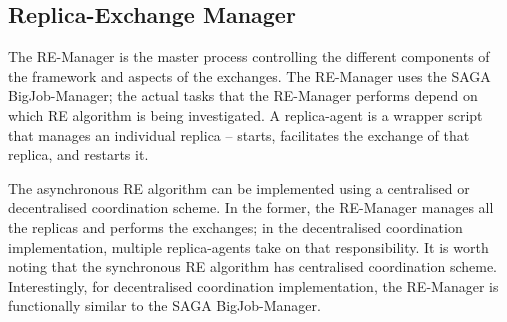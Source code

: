 \documentclass{rspublic}
\newcommand{\jhanote}[1]{ {\textcolor{red} { ***shantenu: #1 }}}
\newcommand{\athotanote}[1]{ {\textcolor{green} { ***athota: #1 }}}
\newcommand{\athotanote}[1]{}
\newcommand{\jhanote}[1]{}
\begin{document}
\subsection{Replica-Exchange Manager}\label{repexmanager} 

  
  
The RE-Manager is the master process controlling the different
components of the framework and aspects of the exchanges. The 
RE-Manager uses the SAGA BigJob-Manager; the actual tasks that the RE-Manager
performs depend on which RE algorithm is being investigated.  A
replica-agent is a wrapper script that manages an individual replica
-- starts, facilitates the exchange of that replica, and restarts it.


The asynchronous RE algorithm can be implemented using a centralised
or decentralised coordination scheme.  In the former, the RE-Manager
manages all the replicas and performs the exchanges; in the
decentralised coordination implementation, multiple replica-agents
take on that responsibility.  It is worth noting that the synchronous
RE algorithm has centralised coordination scheme.  Interestingly, for
decentralised coordination implementation, the RE-Manager is
functionally similar to the SAGA BigJob-Manager.

\end{document}
